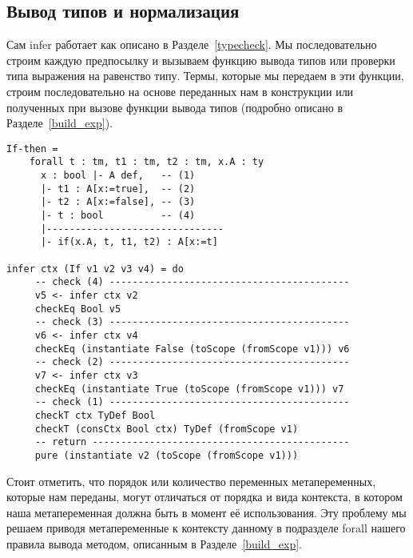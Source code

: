 \subsection{Вывод типов и нормализация}\label{nf_infer}
Сам infer работает как описано в Разделе~\ref{typecheck}. Мы последовательно строим каждую предпосылку и вызываем функцию вывода типов или проверки типа выражения на равенство типу. Термы, которые мы передаем в эти функции, строим последовательно на основе переданных нам в конструкции или полученных при вызове функции вывода типов (подробно описано в Разделе~\ref{build_exp}).

\begin{lstlisting}[caption={Пример правила вывода и части сгенерированной функции infer, соответствующей этому правилу},captionpos=b, frame=single, float, floatplacement=H]
If-then =
    forall t : tm, t1 : tm, t2 : tm, x.A : ty
      x : bool |- A def,   -- (1)
      |- t1 : A[x:=true],  -- (2)
      |- t2 : A[x:=false], -- (3)
      |- t : bool          -- (4)
      |-------------------------------
      |- if(x.A, t, t1, t2) : A[x:=t]

infer ctx (If v1 v2 v3 v4) = do
     -- check (4) ------------------------------------------
     v5 <- infer ctx v2
     checkEq Bool v5
     -- check (3) ------------------------------------------
     v6 <- infer ctx v4
     checkEq (instantiate False (toScope (fromScope v1))) v6
     -- check (2) ------------------------------------------
     v7 <- infer ctx v3
     checkEq (instantiate True (toScope (fromScope v1))) v7
     -- check (1) ------------------------------------------
     checkT ctx TyDef Bool
     checkT (consCtx Bool ctx) TyDef (fromScope v1)
     -- return ---------------------------------------------
     pure (instantiate v2 (toScope (fromScope v1)))
\end{lstlisting}

Стоит отметить, что порядок или количество переменных метапеременных, которые нам переданы, могут отличаться от порядка и вида контекста, в котором наша метапеременная должна быть в момент её использования. Эту проблему мы решаем приводя метапеременные к контексту данному в подразделе forall нашего правила вывода методом, описанным в Разделе~\ref{build_exp}.


